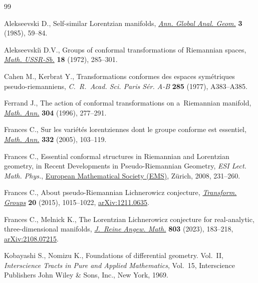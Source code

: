 \documentclass[pdftex]{sigma}
\numberwithin{equation}{section}
\newcommand{\1}{\mathbf{1}}
\newcommand{\+}{\oplus}
\renewcommand{\=}{\equiv}
\begin{document}
\begin{thebibliography}{99}
\footnotesize\itemsep=0pt

Alekseevski D., Self-similar {L}orentzian manifolds, \href{https://doi.org/10.1007/BF00054491}{\textit{Ann. Global Anal.
 Geom.}} \textbf{3} (1985), 59--84.

Alekseevski\u{\i} D.V., Groups of conformal transformations of {R}iemannian
 spaces, \href{https://doi.org/10.1070/SM1972v018n02ABEH001770}{\textit{Math. USSR-Sb.}} \textbf{18} (1972), 285--301.

Cahen M., Kerbrat Y., Transformations conformes des espaces sym\'etriques
 pseudo-riemanniens, \textit{C.~R.~Acad. Sci. Paris S\'er. A-B} \textbf{285}
 (1977), A383--A385.

Ferrand J., The action of conformal transformations on a~{R}iemannian manifold,
 \href{https://doi.org/10.1007/BF01446294}{\textit{Math. Ann.}} \textbf{304} (1996), 277--291.

Frances C., Sur les vari\'et\'es lorentziennes dont le groupe conforme est
 essentiel, \href{https://doi.org/10.1007/s00208-004-0619-x}{\textit{Math. Ann.}} \textbf{332} (2005), 103--119.

Frances C., Essential conformal structures in {R}iemannian and {L}orentzian
 geometry, in Recent Developments in Pseudo-{R}iemannian Geometry, \textit{ESI Lect. Math. Phys.}, \href{https://doi.org/10.4171/051-1/7}{European Mathematical Society (EMS)}, Z\"urich, 2008, 231--260.

Frances C., About pseudo-{R}iemannian {L}ichnerowicz conjecture,
 \href{https://doi.org/10.1007/s00031-015-9317-x}{\textit{Transform. Groups}} \textbf{20} (2015), 1015--1022,
 \href{https://arxiv.org/abs/1211.0635}{arXiv:1211.0635}.

Frances C., Melnick K., The {L}orentzian {L}ichnerowicz conjecture for
 real-analytic, three-dimensional manifolds, \href{https://doi.org/10.1515/crelle-2023-0053}{\textit{J.~Reine Angew. Math.}}
 \textbf{803} (2023), 183--218, \href{https://arxiv.org/abs/2108.07215}{arXiv:2108.07215}.

Kobayashi S., Nomizu K., Foundations of differential geometry. {V}ol.~{II},
 \textit{Interscience Tracts in Pure and Applied Mathematics}, Vol.~15,
 Interscience Publishers John Wiley \& Sons, Inc., New York, 1969.


\end{thebibliography}
\end{document}
